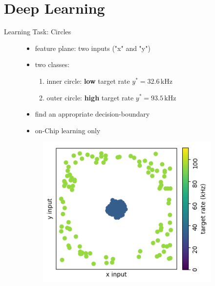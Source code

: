\documentclass[12pt, aspectratio=169]{beamer}
\begin{document}
\section[Learning]{Deep Learning}
\begin{frame}{Learning Task: Circles}
    \begin{figure}[!htb]
            \begin{itemize}
                \item feature plane: two inputs ("x" and "y")
                \item two classes:
                \begin{enumerate}
                    \item inner circle: \textbf{low} target rate $y^* = 32.6\, \text{kHz}$
                    \item outer circle: \textbf{high} target rate $y^* = 93.5\, \text{kHz}$
                \end{enumerate}
                \item find an appropriate decision-boundary
                \item on-Chip learning only
            \end{itemize}
      	\endminipage\hfill
            \centering
            \begin{figure}
                \includegraphics[scale=0.5]{mfp/targets.png}
                \label{membrane_potential}
            \end{figure}
        \endminipage\hfill
    \end{figure}
\end{frame}
\end{document}
